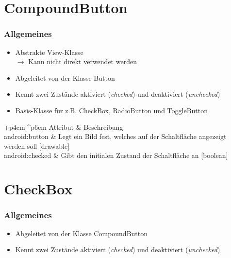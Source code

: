 \section{CompoundButton}
\begin{frame}
   \frametitle{Allgemeines}
   \begin{itemize}
      \item Abstrakte View-Klasse\\
      	$\rightarrow$ Kann nicht direkt verwendet werden
      \item Abgeleitet von der Klasse Button
      \item Kennt zwei Zustände aktiviert (\emph{checked}) und deaktiviert (\emph{unchecked})
      \item Basis-Klasse für z.B. CheckBox, RadioButton und ToggleButton
   \end{itemize}

	\begin{attrDesc}{+p{4cm}|^p{6cm}}
		Attribut & Beschreibung\\
		\hline
		android:button & Legt ein Bild fest, welches auf 
		   der Schaltfläche angezeigt werden soll [drawable]\\
		android:checked & Gibt den initialen Zustand der Schaltfläche an [boolean]\\
	\end{attrDesc}
	
	
\end{frame}

\section{CheckBox}
\begin{frame}
   \frametitle{Allgemeines}
   \begin{itemize}
      \item Abgeleitet von der Klasse CompoundButton
      \item Kennt zwei Zustände aktiviert (\emph{checked}) und deaktiviert (\emph{unchecked})
   \end{itemize}

	
\end{frame}

